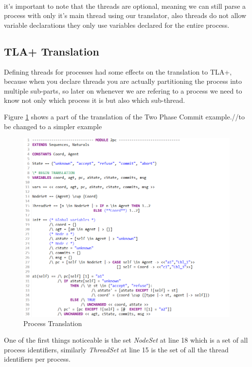 \documentclass{thesul}
\begin{document}
\hfill\\
it's important to note that the threads are optional, meaning we can still parse a process with only it's main thread using our translator, also threads do not allow variable declarations they only use variables declared for the entire process.

\subsection{TLA+ Translation}

Defining threads for processes had some effects on the translation to TLA+, because when you declare threads you are actually partitioning the process into multiple sub-parts, so later on whenever we are refering to a process we need to know not only which process it is but also which sub-thread.

Figure \ref{fig:processtla} shows a part of the translation of the Two Phase Commit example.//to be changed to a simpler example 


\begin{figure}[h!]
\centering
\includegraphics[scale=0.7]{ProcessTLA.png}
\caption{Process Translation}
\label{fig:processtla}
\end{figure}
\FloatBarrier

One of the first things noticeable is the set \textit{NodeSet} at line 18 which is a set of all process identifiers, similarly \textit{ThreadSet} at line 15 is the set of all the thread identifiers per process.
\end{document}
